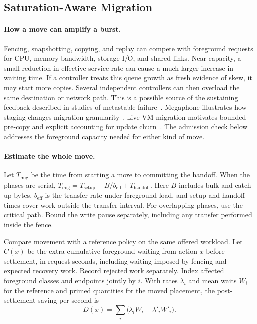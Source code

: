 \documentclass[manuscript]{acmart}
\begin{document}
\subsection{Saturation-Aware Migration}\label{sec:migration-admission}

\paragraph{How a move can amplify a burst.}
Fencing, snapshotting, copying, and replay can compete with foreground requests for CPU, memory bandwidth, storage I/O, and shared links. Near capacity, a small reduction in effective service rate can cause a much larger increase in waiting time. If a controller treats this queue growth as fresh evidence of skew, it may start more copies. Several independent controllers can then overload the same destination or network path. This is a possible source of the sustaining feedback described in studies of metastable failure~\cite{bronson2021metastable}. Megaphone illustrates how staging changes migration granularity~\cite{nasir2019megaphone}. Live VM migration motivates bounded pre-copy and explicit accounting for update churn~\cite{clark2005livemigration}. The admission check below addresses the foreground capacity needed for either kind of move.

\paragraph{Estimate the whole move.}
Let \(T_{\mathrm{mig}}\) be the time from starting a move to committing the handoff. When the phases are serial, \(T_{\mathrm{mig}}=T_{\mathrm{setup}}+B/b_{\mathrm{eff}}+T_{\mathrm{handoff}}\). Here \(B\) includes bulk and catch-up bytes, \(b_{\mathrm{eff}}\) is the transfer rate under foreground load, and setup and handoff times cover work outside the transfer interval. For overlapping phases, use the critical path. Bound the write pause separately, including any transfer performed inside the fence.

Compare movement with a reference policy on the same offered workload. Let \(C(x)\) be the extra cumulative foreground waiting from action \(x\) before settlement, in request-seconds, including waiting imposed by fencing and expected recovery work. Record rejected work separately. Index affected foreground classes and endpoints jointly by \(i\). With rates \(\lambda_i\) and mean waits \(W_i\) for the reference and primed quantities for the moved placement, the post-settlement saving per second is
\[
  D(x)=\sum_i \bigl(\lambda_i W_i-\lambda'_i W'_i\bigr).
\]
\end{document}
